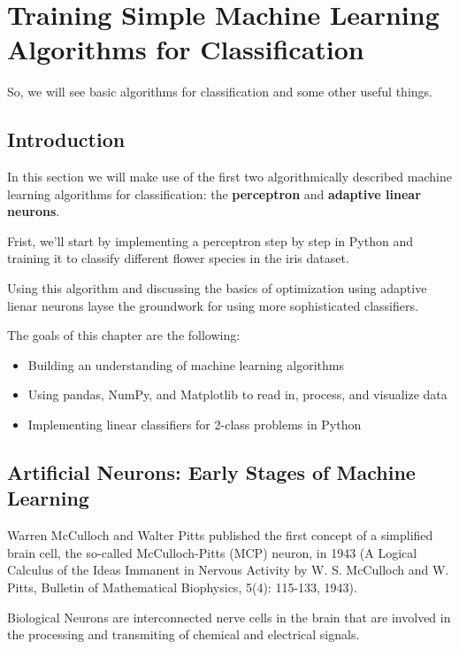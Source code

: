 \documentclass[../machine_learning_scikit.tex]{subfiles}
\begin{document}
    \chapter{Training Simple Machine Learning Algorithms for Classification}

    So, we will see basic algorithms for classification and some other useful things.

    \section{Introduction}

    In this section we will make use of the first two algorithmically described machine learning algorithms for classification: the \textbf{perceptron} and \textbf{adaptive linear neurons}.

    Frist, we'll start by implementing a perceptron step by step in Python and training it to classify different flower species in the iris dataset.

    \begin{obs}
        Using this algorithm and discussing the basics of optimization using adaptive lienar neurons layse the groundwork for using more sophisticated classifiers.
    \end{obs}

    The goals of this chapter are the following:
    \begin{itemize}
        \item Building an understanding of machine learning algorithms
        \item Using pandas, NumPy, and Matplotlib to read in, process, and visualize data
        \item Implementing linear classifiers for 2-class problems in Python
    \end{itemize}

    \section{Artificial Neurons: Early Stages of Machine Learning}

    Warren McCulloch and Walter Pitts published the first concept of a simplified brain cell, the so-called McCulloch-Pitts (MCP) neuron, in 1943 (A Logical Calculus of the Ideas Immanent in Nervous Activity by W. S. McCulloch and W. Pitts, Bulletin of Mathematical Biophysics, 5(4): 115-133, 1943).

    \begin{obs}
        Biological Neurons are interconnected nerve cells in the brain that are involved in the processing and transmiting of chemical and electrical signals.
    \end{obs}
\end{document}
